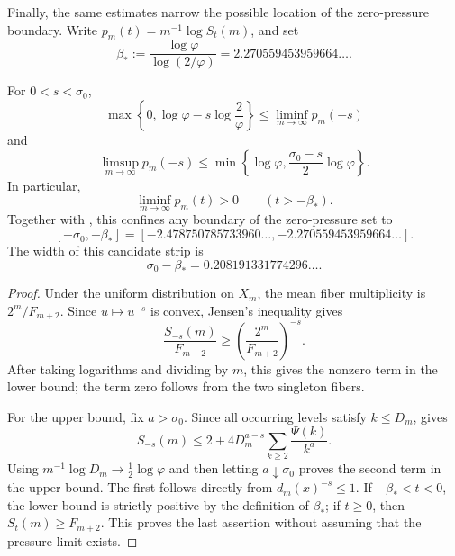 Finally, the same estimates narrow the possible location of the zero-pressure
boundary.  Write \(p_m(t)=m^{-1}\log S_t(m)\), and set
\[
 \beta_*:=\frac{\log\varphi}{\log(2/\varphi)}
 =2.270559453959664\ldots.
\]

\begin{theorem}
\label{thm:pressure-transition-strip}
For \(0<s<\sigma_0\),
\[
 \max\left\{0,\log\varphi-s\log\frac2\varphi\right\}
 \le\liminf_{m\to\infty}p_m(-s)
\]
and
\[
 \limsup_{m\to\infty}p_m(-s)
 \le\min\left\{\log\varphi,
       \frac{\sigma_0-s}{2}\log\varphi\right\}.
\]
In particular,
\[
 \liminf_{m\to\infty}p_m(t)>0\qquad(t>-\beta_*).
\]
Together with , this confines any
boundary of the zero-pressure set to
\[
 [-\sigma_0,-\beta_*]
 =[-2.478750785733960\ldots,-2.270559453959664\ldots].
\]
The width of this candidate strip is
\[
 \sigma_0-\beta_*=0.208191331774296\ldots.
\]
\end{theorem}

\begin{proof}
Under the uniform distribution on \(X_m\), the mean fiber multiplicity is
\(2^m/F_{m+2}\).  Since \(u\mapsto u^{-s}\) is convex, Jensen's inequality
gives
\[
 \frac{S_{-s}(m)}{F_{m+2}}
 \ge\left(\frac{2^m}{F_{m+2}}\right)^{-s}.
\]
After taking logarithms and dividing by \(m\), this gives the nonzero term in
the lower bound; the term zero follows from the two singleton fibers.

For the upper bound, fix \(a>\sigma_0\).  Since all occurring levels satisfy
\(k\le D_m\),  gives
\[
 S_{-s}(m)
 \le2+4D_m^{a-s}\sum_{k\ge2}\frac{\Psi(k)}{k^a}.
\]
Using \(m^{-1}\log D_m\to\tfrac12\log\varphi\) and then letting
\(a\downarrow\sigma_0\) proves the second term in the upper bound.  The
first follows directly from \(d_m(x)^{-s}\le1\).  If
\(-\beta_*<t<0\), the lower bound is strictly positive by the definition of
\(\beta_*\); if \(t\ge0\), then \(S_t(m)\ge F_{m+2}\).  This proves the
last assertion without assuming that the pressure limit exists.
\end{proof}
\fi
